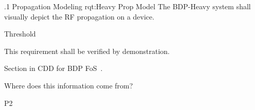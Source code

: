 \ONERQMTVKSA
{\RqtNumberBase.1}
{Propagation Modeling}
{rqt:Heavy Prop Model}
{The BDP-Heavy system shall visually depict the RF propagation on a device.}
{
	\item [Phase 1] Threshold
}
{This requirement shall be verified by demonstration.}
{
\item [5.5.19] Section in CDD for BDP FoS~\cite{ref__BDP_FOS_CDD}.
}
{
	\item Where does this information come from? \TBD
}
{P2}

